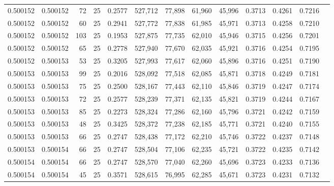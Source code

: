 \begin{tabular}{rrrrrrrrrrrrr}
0.500152 & 0.500152 &    72 &  25 &                                     0.2577 & 527,712 &  77,898 &  61,960 &  45,996 & 0.3713 & 0.4261 & 0.7216 \\
0.500152 & 0.500152 &    60 &  25 &                                     0.2941 & 527,772 &  77,838 &  61,985 &  45,971 & 0.3713 & 0.4258 & 0.7210 \\
0.500152 & 0.500152 &   103 &  25 &                                     0.1953 & 527,875 &  77,735 &  62,010 &  45,946 & 0.3715 & 0.4256 & 0.7201 \\
0.500152 & 0.500152 &    65 &  25 &                                     0.2778 & 527,940 &  77,670 &  62,035 &  45,921 & 0.3716 & 0.4254 & 0.7195 \\
0.500152 & 0.500153 &    53 &  25 &                                     0.3205 & 527,993 &  77,617 &  62,060 &  45,896 & 0.3716 & 0.4251 & 0.7190 \\
0.500153 & 0.500153 &    99 &  25 &                                     0.2016 & 528,092 &  77,518 &  62,085 &  45,871 & 0.3718 & 0.4249 & 0.7181 \\
0.500153 & 0.500153 &    75 &  25 &                                     0.2500 & 528,167 &  77,443 &  62,110 &  45,846 & 0.3719 & 0.4247 & 0.7174 \\
0.500153 & 0.500153 &    72 &  25 &                                     0.2577 & 528,239 &  77,371 &  62,135 &  45,821 & 0.3719 & 0.4244 & 0.7167 \\
0.500153 & 0.500153 &    85 &  25 &                                     0.2273 & 528,324 &  77,286 &  62,160 &  45,796 & 0.3721 & 0.4242 & 0.7159 \\
0.500153 & 0.500153 &    48 &  25 &                                     0.3425 & 528,372 &  77,238 &  62,185 &  45,771 & 0.3721 & 0.4240 & 0.7155 \\
0.500153 & 0.500153 &    66 &  25 &                                     0.2747 & 528,438 &  77,172 &  62,210 &  45,746 & 0.3722 & 0.4237 & 0.7148 \\
0.500153 & 0.500154 &    66 &  25 &                                     0.2747 & 528,504 &  77,106 &  62,235 &  45,721 & 0.3722 & 0.4235 & 0.7142 \\
0.500154 & 0.500154 &    66 &  25 &                                     0.2747 & 528,570 &  77,040 &  62,260 &  45,696 & 0.3723 & 0.4233 & 0.7136 \\
0.500154 & 0.500154 &    45 &  25 &                                     0.3571 & 528,615 &  76,995 &  62,285 &  45,671 & 0.3723 & 0.4231 & 0.7132 \\

\end{tabular}
